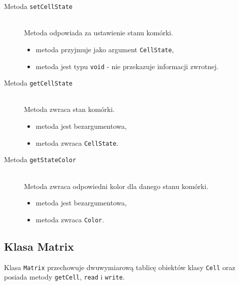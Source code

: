 \documentclass[a4paper,12pt,oneside]{article}
\begin{document}
\begin{description}
\item[Metoda \texttt{setCellState}] \hfill \\
Metoda odpowiada za ustawienie stanu komórki.
\begin{itemize}
\item metoda przyjmuje jako argument \verb+CellState+,
\item metoda jest typu \verb+void+ - nie przekazuje informacji zwrotnej.
\end{itemize}

\item[Metoda \texttt{getCellState}] \hfill \\
Metoda zwraca stan komórki.
\begin{itemize}
\item metoda jest bezargumentowa,
\item metoda zwraca \verb+CellState+.
\end{itemize}

\item[Metoda \texttt{getStateColor}] \hfill \\
Metoda zwraca odpowiedni kolor dla danego stanu komórki.
\begin{itemize}
\item metoda jest bezargumentowa,
\item metoda zwraca \verb+Color+.
\end{itemize}

\end{description}

\subsection{Klasa Matrix}

Klasa \verb+Matrix+ przechowuje dwuwymiarową tablicę obiektów klasy \verb+Cell+ oraz posiada metody \verb+getCell+, \verb+read+ i \verb+write+.
\end{document}

